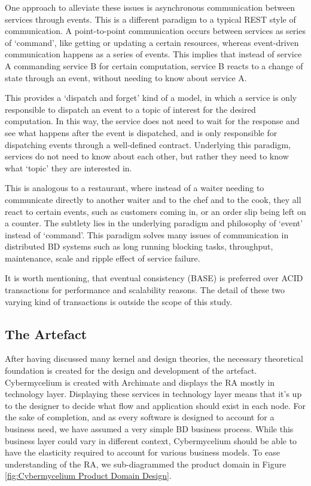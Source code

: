 \documentclass{bmcart}
\begin{document}
One approach to alleviate these issues is asynchronous communication between services through events. This is a different paradigm to a typical REST style of communication. A point-to-point communication occurs between services as series of `command', like getting or updating a certain resources, whereas event-driven communication happens as a series of events. This implies that instead of service A commanding service B for certain computation, service B reacts to a change of state through an event, without needing to know about service A.

This provides a `dispatch and forget' kind of a model, in which a service is only responsible to dispatch an event to a topic of interest for the desired computation. In this way, the service does not need to wait for the response and see what happens after the event is dispatched, and is only responsible for dispatching events through a well-defined contract. Underlying this paradigm, services do not need to know about each other, but rather they need to know what `topic' they are interested in.

This is analogous to a restaurant, where instead of a waiter needing to communicate directly to another waiter and to the chef and to the cook, they all react to certain events, such as customers coming in, or an order slip being left on a counter. The subtlety lies in the underlying paradigm and philosophy of `event' instead of `command'. This paradigm solves many issues of communication in distributed BD systems such as long running blocking tasks, throughput, maintenance, scale and ripple effect of service failure.

It is worth mentioning, that eventual consistency (BASE) is preferred over ACID transactions for performance and scalability reasons. The detail of these two varying kind of transactions is outside the scope of this study.

\subsection{The Artefact} \label{the-artifact}

After having discussed many kernel and design theories, the necessary theoretical foundation is created for the design and development of the artefact. Cybermycelium is created with Archimate and displays the RA mostly in technology layer. Displaying these services in technology layer means that it's up to the designer to decide what flow and application should exist in each node. For the sake of completion, and as every software is designed to account for a business need, we have assumed a very simple BD business process. While this business layer could vary in different context, Cybermycelium should be able to have the elasticity required to account for various business models. To ease understanding of the RA, we sub-diagrammed the product domain in Figure \ref{fig:Cybermycelium Product Domain Design}.
\end{document}
